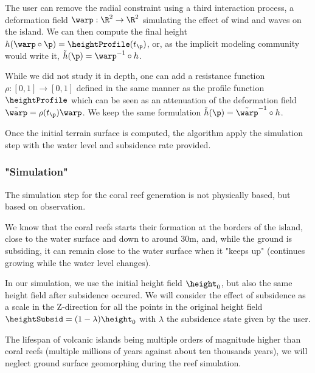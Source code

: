 The user can remove the radial constraint using a third interaction process, a deformation field $\warp: \R^2 \to \R^2$ simulating the effect of wind and waves on the island. We can then compute the final height $h(\warp \circ \p) = \heightProfile(t_{\p})$, or, as the implicit modeling community would write it, $\Tilde{h}(\p) = \warp^{-1} \circ h$.

While we did not study it in depth, one can add a resistance function $\rho: [0, 1] \to [0, 1]$ defined in the same manner as the profile function $\heightProfile$ which can be seen as an attenuation of the deformation field $\Tilde{\warp} = \rho(t_{\p}) \warp$. We keep the same formulation $\Tilde{h}(\p) = \Tilde{\warp}^{-1} \circ h$.

Once the initial terrain surface is computed, the algorithm apply the simulation step with the water level and subsidence rate provided.


\subsubsection{"Simulation"}

The simulation step for the coral reef generation is not physically based, but based on observation.

We know that the coral reefs starts their formation at the borders of the island, close to the water surface and down to around 30m, and, while the ground is subsiding, it can remain close to the water surface when it "keeps up" (continues growing while the water level changes). 

In our simulation, we use the initial height field $\height_0$, but also the same height field after subsidence occured. We will consider the effect of subsidence as a scale in the Z-direction for all the points in the original height field $\heightSubsid = (1 - \lambda) \height_0$ with $\lambda$ the subsidence state given by the user.

The lifespan of volcanic islands being multiple orders of magnitude higher than coral reefs (multiple millions of years against about ten thousands years), we will neglect ground surface geomorphing during the reef simulation. 


